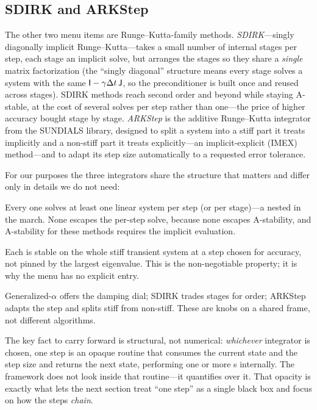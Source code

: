 \subsection{SDIRK and ARKStep}

The other two menu items are Runge--Kutta-family methods. \emph{SDIRK}---singly
diagonally implicit Runge--Kutta---takes a small number of internal stages per
step, each stage an implicit solve, but arranges the stages so they share a
\emph{single} matrix factorization (the ``singly diagonal'' structure means every
stage solves a system with the same $\mathsf{I} - \gamma\Delta t\,\mathsf{J}$, so the
preconditioner is built once and reused across stages). SDIRK methods reach second
order and beyond while staying A-stable, at the cost of several solves per step
rather than one---the price of higher accuracy bought stage by stage.
\emph{ARKStep} is the additive Runge--Kutta integrator from the SUNDIALS library,
designed to split a system into a stiff part it treats implicitly and a non-stiff
part it treats explicitly---an implicit-explicit (IMEX) method---and to adapt its
step size automatically to a requested error tolerance.

For our purposes the three integrators share the structure that matters and differ
only in details we do not need:

\begin{description}[style=nextline, leftmargin=0pt, font=\normalfont\itshape]
  \item[All are implicit.] Every one solves at least one linear system per step (or
  per stage)---a  nested in the march. None escapes the per-step
  solve, because none escapes A-stability, and A-stability for these methods
  requires the implicit evaluation.
  \item[All are A-stable.] Each is stable on the whole stiff transient system at a
  step chosen for accuracy, not pinned by the largest eigenvalue. This is the
  non-negotiable property; it is why the menu has no explicit entry.
  \item[They differ in order, stage count, and damping control.]
  Generalized-$\alpha$ offers the damping dial; SDIRK trades stages for order;
  ARKStep adapts the step and splits stiff from non-stiff. These are knobs on a
  shared frame, not different algorithms.
\end{description}

\begin{notationbox}
The key fact to carry forward is structural, not numerical: \emph{whichever}
integrator is chosen, one step is an opaque routine that consumes the current
state and the step size and returns the next state, performing one or more
s internally. The framework does not look inside that routine---it
quantifies over it. That opacity is exactly what lets the next section treat
``one step'' as a single black box and focus on how the steps \emph{chain}.
\end{notationbox}

